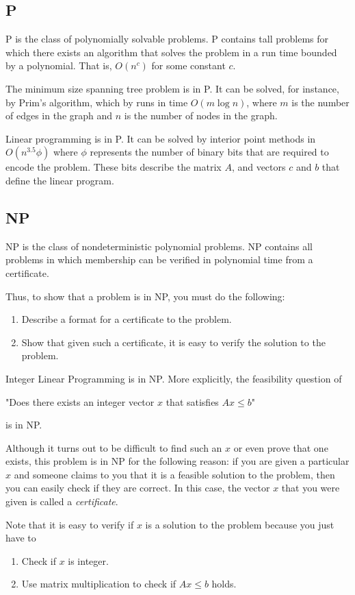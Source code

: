 \documentclass[../open-optimization/open-optimization.tex]{subfiles}
\begin{document}
\subsection{P}
P is the class of polynomially solvable problems.  P contains tall problems for which there exists an algorithm that solves the problem in a run time bounded by a polynomial. That is, $O(n^c)$ for some constant $c$.
\begin{example}
The minimum size spanning tree problem is in P.  It can be solved, for instance, by Prim's algorithm, which  by runs in time $O(m \log n)$, where $m$ is the number of edges in the graph and $n$ is the number of nodes in the graph.  
\end{example}
\begin{example}
Linear programming is in P.  It can be solved by interior point methods in $O(n^{3.5} \phi)$ where $\phi$ represents the number of binary bits that are required to encode the problem.  These bits describe the matrix $A$, and vectors $c$ and $b$ that define the linear program.
\end{example}
\subsection{NP}
NP is the class of nondeterministic polynomial problems.  NP contains all problems in which membership can be verified in polynomial time from a certificate.

Thus, to show that a problem is in NP, you must do the following:
\begin{enumerate}
\item Describe a format for a certificate to the problem.
\item Show that given such a certificate, it is easy to verify the solution to the problem.
\end{enumerate}
\begin{example}
Integer Linear Programming is in NP.  More explicitly, the feasibility question of
\begin{center}
"Does there exists an integer vector $x$ that satisfies $Ax\leq b$"
\end{center}
is in NP.  

Although it turns out to be difficult to find such an $x$ or even prove that one exists, this problem is in NP for the following reason:  if you are given a particular $x$ and someone claims to you that it is a feasible solution to the problem, then you can easily check if they are correct.  
In this case, the vector $x$ that you were given is called a \emph{certificate}.

Note that it is easy to verify if $x$ is a solution to the problem because you just have to 
\begin{enumerate}
\item Check if $x$ is integer.
\item Use matrix multiplication to check if $Ax \leq b$ holds.
\end{enumerate}
\end{example}
\end{document}

